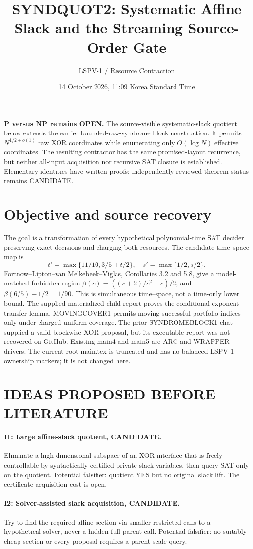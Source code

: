 \documentclass[11pt]{article}
\title{SYNDQUOT2: Systematic Affine Slack and the Streaming Source-Order Gate}
\author{LSPV-1 / Resource Contraction}
\date{14 October 2026, 11:09 Korea Standard Time}
\begin{document}
\maketitle
\noindent\textbf{P versus NP remains OPEN.} The source-visible systematic-slack quotient
below extends the earlier bounded-raw-syndrome block construction. It
permits $N^{1/2+o(1)}$ raw XOR coordinates while enumerating only
$O(\log N)$ effective coordinates. The resulting contractor has the
same promised-layout recurrence, but neither all-input acquisition nor
recursive SAT closure is established. Elementary identities have written
proofs; independently reviewed theorem status remains CANDIDATE.
\section{Objective and source recovery}
The goal is a transformation of every hypothetical polynomial-time
SAT decider preserving exact decisions and charging both resources.
The candidate time--space map is
\[
t'=\max\{11/10,3/5+t/2\},\quad
s'=\max\{1/2,s/2\}.
\]
Fortnow--Lipton--van Melkebeek--Viglas, Corollaries 3.2 and 5.8,
give a model-matched forbidden region
$\beta(c)=((c+2)/c^2-c)/2$, and
$\beta(6/5)-1/2=1/90$. This is simultaneous time--space, not a
time-only lower bound. The supplied materialized-child report proves
the conditional exponent-transfer lemma. MOVINGCOVER1 permits moving
successful portfolio indices only under charged uniform coverage.
The prior SYNDROMEBLOCK1 chat supplied a valid blockwise XOR
proposal, but its executable report was not recovered on GitHub.
Existing main4 and main5 are ARC and WRAPPER drivers. The current
root main.tex is truncated and has no balanced LSPV-1 ownership
markers; it is not changed here.
\section{IDEAS PROPOSED BEFORE LITERATURE}
\paragraph{I1: Large affine-slack quotient, CANDIDATE.}
Eliminate a high-dimensional subspace of an XOR interface that is
freely controllable by syntactically certified private slack variables,
then query SAT only on the quotient. Potential falsifier: quotient YES
but no original slack lift. The certificate-acquisition cost is open.
\paragraph{I2: Solver-assisted slack acquisition, CANDIDATE.}
Try to find the required affine section via smaller restricted calls
to a hypothetical solver, never a hidden full-parent call.
Potential falsifier: no suitably cheap section or every proposal
requires a parent-scale query.
\end{document}
